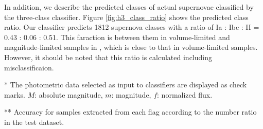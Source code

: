\documentclass[useamsfonts]{pasj01}
\begin{document}
In addition, we describe the predicted classes of actual supernovae classified by the three-class classifier.
Figure \ref{fig:h3_class_ratio} shows the predicted class ratio.
Our classifier predicts 1812 supernova classes with a ratio of Ia : Ibc : II = 0.43 : 0.06 : 0.51.
This faraction is between them in volume-limited and magnitude-limited samples in \citet{Li_2011}, which is close to that in volume-limited samples.
However, it should be noted that this ratio is calculated including misclassificaion.
%
%
\begin{table}[ht]
\label{tab:h3_validation}
\begin{tabnote}
* The photometric data selected as input to classifiers are displayed as check marks.
$M$: absolute magnitude, $m$: magnitude, $f$: normalized flux.

** Accuracy for samples extracted from each flag according to the number ratio in the test dataset.
\end{tabnote}
\end{table}
%
%
\end{document}
